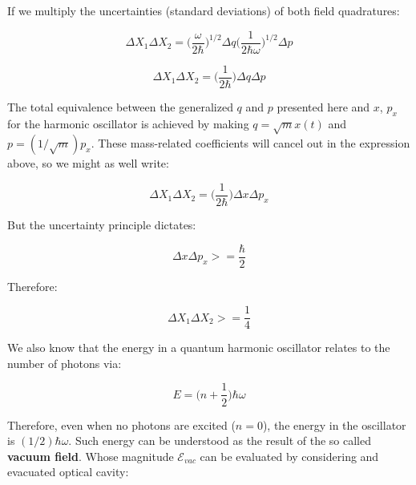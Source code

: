 \documentclass[12pt,a4paper]{report}
\begin{document}
If we multiply the uncertainties (standard deviations) of both field quadratures:

\begin{equation}
    \Delta X_1\Delta X_2=\Big(\frac{\omega}{2\hbar}\Big)^{1/2}\Delta q\Big(\frac{1}{2\hbar\omega}\Big)^{1/2}\Delta p
\end{equation}

\begin{equation}
    \Delta X_1\Delta X_2=\Big(\frac{1}{2\hbar}\Big)\Delta q\Delta p
\end{equation}

The total equivalence between the generalized $q$ and $p$ presented here and $x$, $p_x$ for the harmonic oscillator is achieved by making $q=\sqrt{m}x(t)$ and $p=(1/\sqrt{m})p_x$. These mass-related coefficients will cancel out in the expression above, so we might as well write:

\begin{equation}
    \Delta X_1\Delta X_2=\Big(\frac{1}{2\hbar}\Big)\Delta x\Delta p_x
\end{equation}

But the uncertainty principle dictates:

\begin{equation}
    \Delta x \Delta p_x>=\frac{\hbar}{2}
\end{equation}

Therefore:

\begin{equation}
    \boxed{\Delta X_1 \Delta X_2>=\frac{1}{4}}
\end{equation}

\begin{center}
\end{center}

We also know that the energy in a quantum harmonic oscillator relates to the number of photons via:

\begin{equation}
    E=\Big(n+\frac{1}{2}\Big)\hbar\omega
\end{equation}

Therefore, even when no photons are excited ($n=0$), the energy in the oscillator is $(1/2)\hbar\omega$. Such energy can be understood as the result of the so called \textbf{vacuum field}. Whose magnitude $\mathcal{E}_{vac}$ can be evaluated by considering and evacuated optical cavity:
\end{document}
